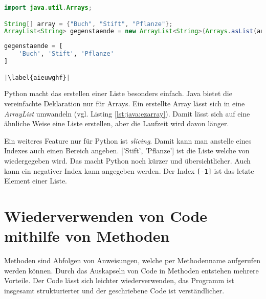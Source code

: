 \begin{minipage}{.5\linewidth}
\begin{lstlisting}[language=java,caption={Einfache Deklarierung Java},captionpos=b,label={lst:java:ezarray},frame=none]
import java.util.Arrays;

String[] array = {"Buch", "Stift", "Pflanze"};
ArrayList<String> gegenstaende = new ArrayList<String>(Arrays.asList(array));
\end{lstlisting}
\end{minipage}
\begin{minipage}{.5\linewidth}
\begin{lstlisting}[language=python,caption={Einfach Deklarierung Python},captionpos=b,label={lst:python:ezarray},frame=l,escapechar=|]
gegenstaende = [
    'Buch', 'Stift', 'Pflanze'
]

|\label{aieuwghf}|
\end{lstlisting}
\end{minipage}

Python macht das erstellen einer Liste besonders einfach. Java bietet die vereinfachte Deklaration nur für Arrays. Ein erstellte Array lässt sich in eine \textit{ArrayList} umwandeln (vgl. Listing \ref{lst:java:ezarray}). Damit lässt sich auf eine ähnliche Weise eine Liste erstellen, aber die Laufzeit wird davon länger.

Ein weiteres Feature nur für Python ist \textit{slicing}. Damit kann man anstelle eines Indexes auch einen Bereich angeben. ['Stift', 'Pflanze'] ist die Liste welche von  wiedergegeben wird. Das macht Python noch kürzer und übersichtlicher. Auch kann ein negativer Index kann angegeben werden. Der Index \texttt{[-1]} ist das letzte Element einer Liste.\par

\section{Wiederverwenden von Code mithilfe von Methoden}
Methoden sind Abfolgen von Anweisungen, welche per Methodenname aufgerufen werden können. Durch das Auskapseln von Code in Methoden entstehen mehrere Vorteile. Der Code lässt sich leichter wiederverwenden, das Programm ist insgesamt strukturierter und der geschriebene Code ist verständlicher. \cite{Python3:Buch}\cite{Louis:2010}

